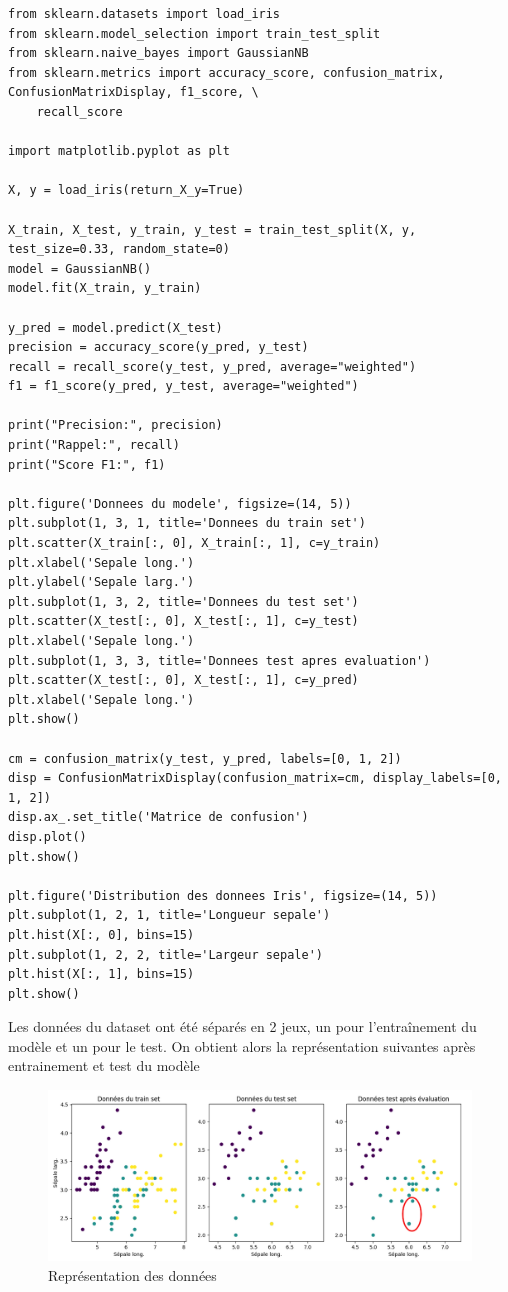 \documentclass[a4paper,12pt]{article}
\begin{document}
\begin{lstlisting}[title=Progamme complet]
from sklearn.datasets import load_iris
from sklearn.model_selection import train_test_split
from sklearn.naive_bayes import GaussianNB
from sklearn.metrics import accuracy_score, confusion_matrix, ConfusionMatrixDisplay, f1_score, \
    recall_score

import matplotlib.pyplot as plt

X, y = load_iris(return_X_y=True)

X_train, X_test, y_train, y_test = train_test_split(X, y, test_size=0.33, random_state=0)
model = GaussianNB()
model.fit(X_train, y_train)

y_pred = model.predict(X_test)
precision = accuracy_score(y_pred, y_test)
recall = recall_score(y_test, y_pred, average="weighted")
f1 = f1_score(y_pred, y_test, average="weighted")

print("Precision:", precision)
print("Rappel:", recall)
print("Score F1:", f1)

plt.figure('Donnees du modele', figsize=(14, 5))
plt.subplot(1, 3, 1, title='Donnees du train set')
plt.scatter(X_train[:, 0], X_train[:, 1], c=y_train)
plt.xlabel('Sepale long.')
plt.ylabel('Sepale larg.')
plt.subplot(1, 3, 2, title='Donnees du test set')
plt.scatter(X_test[:, 0], X_test[:, 1], c=y_test)
plt.xlabel('Sepale long.')
plt.subplot(1, 3, 3, title='Donnees test apres evaluation')
plt.scatter(X_test[:, 0], X_test[:, 1], c=y_pred)
plt.xlabel('Sepale long.')
plt.show()

cm = confusion_matrix(y_test, y_pred, labels=[0, 1, 2])
disp = ConfusionMatrixDisplay(confusion_matrix=cm, display_labels=[0, 1, 2])
disp.ax_.set_title('Matrice de confusion')
disp.plot()
plt.show()

plt.figure('Distribution des donnees Iris', figsize=(14, 5))
plt.subplot(1, 2, 1, title='Longueur sepale')
plt.hist(X[:, 0], bins=15)
plt.subplot(1, 2, 2, title='Largeur sepale')
plt.hist(X[:, 1], bins=15)
plt.show()\end{lstlisting}
				
				Les données du dataset ont été séparés en 2 jeux, un pour l’entraînement du modèle et un pour le test. On obtient alors la représentation suivantes après entrainement et test du modèle
				\begin{figure}[H]
					\includegraphics[width=\linewidth]{img/NBdata.png}
					\caption{Représentation des données }
				\end{figure}
				
\end{document}

